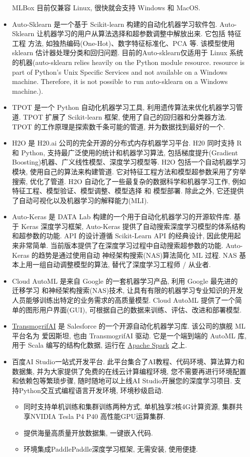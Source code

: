 \begin{itemize}
MLBox 目前仅兼容 Linux, 很快就会支持 Windows 和 MacOS.
\item Auto-Sklearn 是一个基于  Scikit-learn 构建的自动化机器学习软件包. Auto-Sklearn 让机器学习的用户从算法选择和超参数调整中解放出来. 它包括 特征工程 方法, 如独热编码(One-Hot)、数字特征标准化、PCA 等. 该模型使用 sklearn 估计器处理分类和回归问题.
目前的Auto-sklearn仅适用于 Linux 系统的机器(auto-sklearn relies heavily on the Python module resource. resource is part of Python’s Unix Specific Services and not available on a Windows machine. Therefore, it is not possible to run auto-sklearn on a Windows machine.).
\item TPOT 是一个 Python 自动化机器学习工具, 利用遗传算法来优化机器学习管道. TPOT 扩展了 Scikit-learn 框架, 使用了自己的回归器和分类器方法. TPOT 的工作原理是探索数千条可能的管道, 并为数据找到最好的一个.
\item H2O 是  H20.ai 公司的完全开源的分布式内存机器学习平台. H20 同时支持 R 和 Python, 支持最广泛使用的统计和机器学习算法, 包括梯度提升(Gradient Boosting)机器、广义线性模型、深度学习模型等.
H2O 包括一个自动机器学习模块, 使用自己的算法来构建管道. 它对特征工程方法和模型超参数采用了穷举搜索, 优化了管道.
H2O 自动化了一些最复杂的数据科学和机器学习工作, 例如特征工程、模型验证、模型调整、模型选择 和 模型部署. 除此之外, 它还提供了自动可视化以及机器学习的解释能力(MLI).
\item Auto-Keras 是 DATA Lab 构建的一个用于自动化机器学习的开源软件库. 基于  Keras 深度学习框架, Auto-Keras 提供了自动搜索深度学习模型的体系结构和超参数的功能.
API 的设计遵循 Scikit-Learn API 的经典设计, 因此使用起来非常简单. 当前版本提供了在深度学习过程中自动搜索超参数的功能.
Auto-Keras 的趋势是通过使用自动 神经架构搜索(NAS)算法简化 ML 过程. NAS 基本上用一组自动调整模型的算法, 替代了深度学习工程师 / 从业者.
\item Cloud AutoML 是来自 Google 的一套机器学习产品, 利用 Google 最先进的 迁移学习 和神经架构搜索(NAS)技术, 让具有有限的机器学习专业知识的开发人员能够训练出特定的业务需求的高质量模型.
Cloud AutoML 提供了一个简单的图形用户界面(GUI), 可根据自己的数据来训练、评估、改进和部署模型.
\item \href{https://github.com/salesforce/TransmogrifAI}{TransmogrifAI} 是  Salesforce 的一个开源自动化机器学习库. 该公司的旗舰 ML 平台名为 爱因斯坦, 也由 TransmogrifAI 驱动. 它是一个端到端的 AutoML 库, 用于 Scala 编写的结构化数据, 运行在  \href{http://spark.apache.org/}{Apache Spark} 之上.
\item 百度AI Studio一站式开发平台. 此平台集合了AI教程、代码环境、算法算力和数据集, 并为大家提供了免费的在线云计算编程环境, 您不需要再进行环境配置和依赖包等繁琐步骤, 随时随地可以上线AI Studio开展您的深度学习项目.
支持Python交互式编程语言开发环境, 环境秒级启动.
\begin{itemize}
\item 同时支持单机训练和集群训练两种方式, 单机独享2核4G计算资源, 集群共享NVIDIA Tesla P4 P40 高性能GPU运算集群.
\item 提供海量高质量开放数据集, 一键嵌入代码.
\item 环境集成PaddlePaddle深度学习框架, 无需安装, 使用便捷.
\end{itemize}
\end{itemize}


